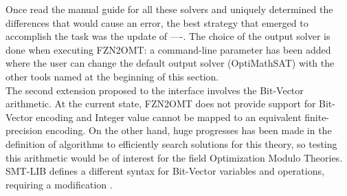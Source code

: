 Once read the manual guide for all these solvers and uniquely determined the differences that would cause an error, the best strategy that emerged to accomplish the task was the update of ----. The choice of the output solver is done when executing FZN2OMT: a command-line parameter has been added where the user can change the default output solver (OptiMathSAT) with the other tools named at the beginning of this section. \\
The second extension proposed to the interface involves the Bit-Vector arithmetic. At the current state, FZN2OMT does not provide support for Bit-Vector encoding and Integer value cannot be mapped to an equivalent finite-precision encoding. On the other hand, huge progresses has been made in the definition of algorithms to efficiently search solutions for this theory, so testing this arithmetic would be of interest for the field Optimization Modulo Theories. SMT-LIB defines a different syntax for Bit-Vector variables and operations, requiring a modification .  

\pagebreak
